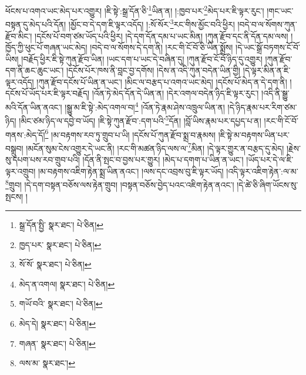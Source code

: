 ཕོངས་པ་འགའ་ཡང་མེད་པར་འགྱུར། །ཇི་སྟེ་:སྒྲ་དོན་ཅི་\footnote{སྒྲ་དོན་སྤྱི་  སྣར་ཐང་།  པེ་ཅིན། }ཡིན་ན། །:ཁྱབ་པར་\footnote{ཁྱད་པར་  སྣར་ཐང་།  པེ་ཅིན། }མེད་པར་ཇི་ལྟར་རུང་། །གང་ཡང་བསྟན་དུ་མེད་པའི་དོན། །མྱོང་བ་དེ་དག་ཇི་ལྟར་འདོད། །:སོ་སོར་\footnote{སོ་སོ་  སྣར་ཐང་།  པེ་ཅིན། }རང་གིས་མྱོང་བའི་ཕྱིར། །བདེ་བ་ལ་སོགས་ཀུན་རྫོབ་མིང་། །དངོས་པོ་བག་ཙམ་ཡོད་པའི་ཕྱིར། །དེ་དག་དོན་དམ་པ་ཡང་མིན། །ཀུན་རྫོབ་དང་ནི་དོན་དམ་ལས། །ཁྱོད་ཀྱི་ཕུང་པོ་གཞན་ཡང་མེད། །བདེ་བ་ལ་སོགས་དེ་དག་ནི། །རང་གི་ངོ་བོ་ཅི་ཡིན་སྨྲོས། །དེ་ཡང་སྒྲོ་བཏགས་ངོ་བོ་ཡིས། །བརྗོད་ཕྱིར་ཇི་སྟེ་ཀུན་རྫོབ་ཡིན། །ཡང་དག་པ་ཡང་དེ་བཞིན་དུ། །ཀུན་རྫོབ་ངོ་བོ་ཉིད་དུ་འགྱུར། །ཀུན་རྫོབ་དག་ནི་ཆང་ཆུང་ཡང་། །དངོས་པོར་ཁས་ནི་བླང་བྱ་དགོས། །དེས་ན་འདི་ཀུན་བདེན་ཡིན་གྱི། །དེ་ལྟར་མིན་ན་ཇི་ལྟར་འདོད། །ཀུན་རྫོབ་དངོས་པོ་ཡིན་ན་ཡང་། །མིང་ལ་བརྩད་པ་འགའ་ཡང་མེད། །དངོས་པོ་མེད་ན་དེ་དག་ནི། །དངོས་པོ་ཡོད་པར་ཇི་ལྟར་བརྗོད། །འོན་ཏེ་མེད་དོན་དེ་ཡིན་ན། །དེར་འགལ་བདེན་ཉིད་ཇི་ལྟར་རུང་། །འདི་ནི་སྒྱུ་མའི་དོན་ཡིན་ནའང་། །སྒྱུ་མ་ཇི་སྟེ་:མེད་འགལ་བ།\footnote{མེད་ན་འགལ།  སྣར་ཐང་།  པེ་ཅིན། } །འོན་ཏེ་རྣམ་ཤེས་འཁྲུལ་ཡིན་ན། །དེ་ཉིད་རྣམ་པར་རིག་ཙམ་ཉིད། །མིང་ཙམ་ཉིད་ལ་དབྱེ་བ་ཡོད། །ཇི་སྟེ་ཀུན་རྫོབ་:དག་པའི་\footnote{གཡོ་བའི་  སྣར་ཐང་།  པེ་ཅིན། }དོན། །བློ་ཡིས་རྣམ་པར་དཔྱད་པ་ན། །རང་གི་ངོ་བོ་གནས་:མེད་དོ།\footnote{མེད་དེ།  སྣར་ཐང་།  པེ་ཅིན། } །མ་བརྟགས་རབ་ཏུ་གྲུབ་པ་ཡི། །དངོས་པོ་ཀུན་རྫོབ་སྨྲ་བ་རྣམས། །ཇི་སྟེ་མ་བརྟགས་ཡིན་པར་བསྒྲུབ། །མངོན་སུམ་ངེས་འགྱུར་དེ་ཡང་ནི། །རང་གི་མཚན་ཉིད་ལས་ལ་\footnote{གཞན་  སྣར་ཐང་།  པེ་ཅིན། }མིན། །དེ་ལྟར་གྱུར་ན་བརྩད་དུ་མེད། །རྗེས་སུ་དཔག་པས་རབ་གྲུབ་པའི། །དོན་ནི་སྤང་བ་བྱས་པར་གྱུར། །མེད་པ་དགག་པ་ཡིན་ན་ཡང་། །ཡོད་པར་དེ་ལ་ཇི་ལྟར་འགྲུབ། །མ་བརྟགས་འཇིག་རྟེན་སྨྲ་ཡིན་ནའང་། །ལས་དང་འབྲས་བུ་ཇི་ལྟར་ཡོད། །འདི་ལྟར་འཇིག་རྟེན་:ལ་མ་\footnote{ལས་མ་  སྣར་ཐང་། }གྲུབ། །དེ་དག་བསྟན་བཅོས་ལས་རྟེན་གྲུབ། །བསྟན་བཅོས་བྱེད་པའང་འཇིག་རྟེན་ནའང་། །དེ་ཚེ་ཅི་ཞིག་ཡོངས་སུ་སྤངས། །
